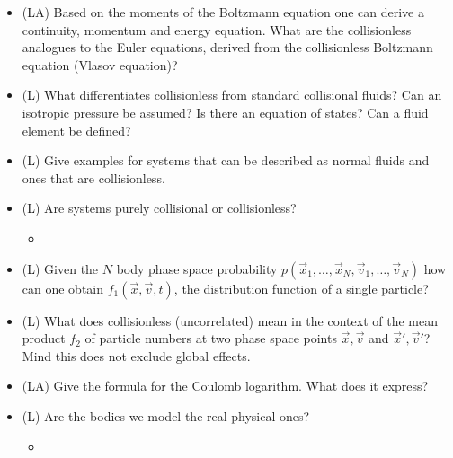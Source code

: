 \begin{itemize}
    \item (LA) Based on the moments of the Boltzmann equation one can derive
    a continuity, momentum and energy equation. What are the collisionless analogues
    to the Euler equations, derived from the collisionless Boltzmann equation (Vlasov equation)?
    \item (L) What differentiates collisionless from standard collisional fluids? Can an isotropic
    pressure be assumed? Is there an equation of states? Can a fluid element be defined?
    \item (L) Give examples for systems that can be described as normal fluids and ones that are collisionless.
    \item (L) Are systems purely collisional or collisionless?
    \begin{itemize}
        \item {}
    \end{itemize}
    \item (L) Given the $N$ body phase space probability $p\left(\vec{x}_1, \ldots, \vec{x}_N, \vec{v}_1, \ldots, \vec{v}_N\right)$ how
    can one obtain $f_1(\vec{x}, \vec{v}, t)$, the distribution function of a single particle?
    \item (L) What does collisionless (uncorrelated) mean in the context of the mean product $f_2$ of particle numbers
    at two phase space points $\vec{x}, \vec{v}$ and $\vec{x}', \vec{v}'$? Mind this does not exclude global effects.
    \item (LA) Give the formula for the Coulomb logarithm. What does it express?
    \item (L) Are the bodies we model the real physical ones?
    \begin{itemize}
        \item {}
    \end{itemize}

\end{itemize}
